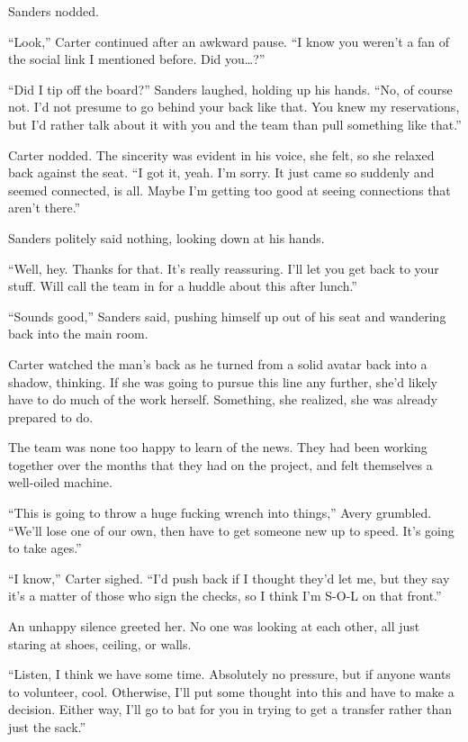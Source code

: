 Sanders nodded.

``Look,'' Carter continued after an awkward pause. ``I know you weren't a fan of the social link I mentioned before. Did you\ldots{}?''

``Did I tip off the board?'' Sanders laughed, holding up his hands. ``No, of course not. I'd not presume to go behind your back like that. You knew my reservations, but I'd rather talk about it with you and the team than pull something like that.''

Carter nodded. The sincerity was evident in his voice, she felt, so she relaxed back against the seat. ``I got it, yeah. I'm sorry. It just came so suddenly and seemed connected, is all. Maybe I'm getting too good at seeing connections that aren't there.''

Sanders politely said nothing, looking down at his hands.

``Well, hey. Thanks for that. It's really reassuring. I'll let you get back to your stuff. Will call the team in for a huddle about this after lunch.''

``Sounds good,'' Sanders said, pushing himself up out of his seat and wandering back into the main room.

Carter watched the man's back as he turned from a solid avatar back into a shadow, thinking. If she was going to pursue this line any further, she'd likely have to do much of the work herself. Something, she realized, she was already prepared to do.

The team was none too happy to learn of the news. They had been working together over the months that they had on the project, and felt themselves a well-oiled machine.

``This is going to throw a huge fucking wrench into things,'' Avery grumbled. ``We'll lose one of our own, then have to get someone new up to speed. It's going to take ages.''

``I know,'' Carter sighed. ``I'd push back if I thought they'd let me, but they say it's a matter of those who sign the checks, so I think I'm S-O-L on that front.''

An unhappy silence greeted her. No one was looking at each other, all just staring at shoes, ceiling, or walls.

``Listen, I think we have some time. Absolutely no pressure, but if anyone wants to volunteer, cool. Otherwise, I'll put some thought into this and have to make a decision. Either way, I'll go to bat for you in trying to get a transfer rather than just the sack.''

